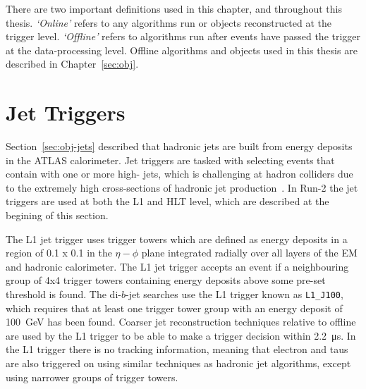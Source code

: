 There are two important definitions used in this chapter, and throughout this thesis.
\textit{`Online'} refers to any algorithms run or objects reconstructed at the trigger level.
\textit{`Offline'} refers to algorithms run after events have passed the trigger at the data-processing level.
Offline algorithms and objects used in this thesis are described in Chapter~\ref{sec:obj}.

\section{Jet Triggers}
\label{sec:trig-jet}

Section~\ref{sec:obj-jets} described that hadronic jets are built from energy deposits in the ATLAS calorimeter.
Jet triggers are tasked with selecting events that contain with one or more high-\pT{} jets,
which is challenging at hadron colliders due to the extremely high cross-sections of hadronic jet production~\cite{trig-run2_proc}.
In Run-2 the jet triggers are used at both the L1 and HLT level, which are described at the begining of this section.


The L1 jet trigger uses trigger towers which are defined as energy deposits in a region of 0.1 x 0.1 in the $\eta-\phi$ plane integrated radially over all layers of the EM and hadronic calorimeter.
The L1 jet trigger accepts an event if a neighbouring group of 4x4 trigger towers containing energy deposits above some pre-set threshold is found.
The di-$b$-jet searches use the L1 trigger known as \verb|L1_J100|, which requires that at least one trigger tower group with an energy deposit of \SI{100}{\GeV} has been found.
Coarser jet reconstruction techniques relative to offline are used by the L1 trigger to be able to make a trigger decision within \SI{2.2}{\micro\second}.
In the  L1 trigger there is no tracking information, meaning that electron and taus
are also triggered on using similar techniques as hadronic jet algorithms, except using narrower groups of trigger towers.


